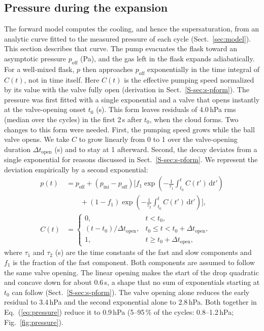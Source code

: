 \documentclass[preprint,review,12pt,authoryear]{elsarticle}
\begin{document}
\subsection{Pressure during the expansion}
\label{sec:pressure}
The forward model computes the cooling, and hence the supersaturation, from an analytic curve fitted to the
measured pressure of each cycle (Sect.~\ref{sec:model}). This section describes that curve.
The pump evacuates the flask toward an asymptotic pressure $p_\mathrm{off}$ (Pa), and the gas left in
the flask expands adiabatically.
For a well-mixed flask, $p$ then approaches $p_\mathrm{off}$ exponentially in the time integral of $C(t)$,
not in time itself. Here $C(t)$ is the effective pumping speed normalized by its value with the valve fully
open (derivation in Sect.~\ref{S-sec:s-pform}).
The pressure was first fitted with a single exponential and a valve that opens instantly at the
valve-opening onset $t_0$ (s).
This form leaves residuals of 4.0\,hPa rms (median over the cycles) in the first 2\,s after $t_0$,
when the cloud forms.
Two changes to this form were needed. First, the pumping speed grows while the ball valve opens. We take $C$
to grow linearly from 0 to 1 over the valve-opening duration $\Delta t_\mathrm{open}$ (s) and to stay
at 1 afterward.
Second, the decay deviates from a single exponential for reasons discussed in
Sect.~\ref{S-sec:s-pform}. We represent the deviation empirically by a second exponential:
\begin{equation}
\begin{aligned}
p(t) &= p_\mathrm{off} + (p_\mathrm{ini} - p_\mathrm{off})
\biggl[f_1 \exp\!\left(-\frac{1}{\tau_1}\int_{t_0}^{t} C(t')\,\mathrm{d}t'\right)\\
&\qquad + (1 - f_1) \exp\!\left(-\frac{1}{\tau_2}\int_{t_0}^{t} C(t')\,\mathrm{d}t'\right)\biggr],\\
C(t) &= \begin{cases}
0, & t < t_0,\\
(t - t_0)/\Delta t_\mathrm{open}, & t_0 \le t < t_0 + \Delta t_\mathrm{open},\\
1, & t \ge t_0 + \Delta t_\mathrm{open},
\end{cases}
\end{aligned}
\label{eq:pressure}
\end{equation}
where $\tau_1$ and $\tau_2$ (s) are the time constants of the fast and slow components and $f_1$
is the fraction of the fast component.
Both components are assumed to follow the same valve opening.
The linear opening makes the start of the drop quadratic and concave down for about 0.6\,s, a shape
that no sum of exponentials starting at $t_0$ can follow (Sect.~\ref{S-sec:s-pform}).
The valve opening alone reduces the early residual to 3.4\,hPa and the second exponential alone to 2.8\,hPa.
Both together in Eq.~(\ref{eq:pressure}) reduce it to 0.9\,hPa
(5--95\,\% of the cycles: 0.8--1.2\,hPa; Fig.~\ref{fig:pressure}).
\end{document}

